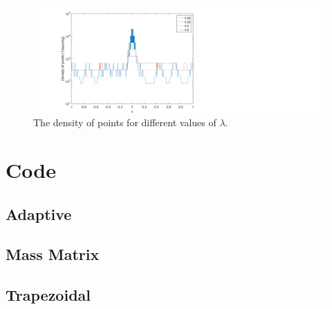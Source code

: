 \begin{figure}
\centering
\includegraphics[width=1.5\textwidth]{figures/spacing}
\caption{The density of points for different values of $\lambda$.}
\label{fig:spacing}
\end{figure}
\newpage
\section{Code}
\subsection{Adaptive}

\subsection{Mass Matrix}

\subsection{Trapezoidal}




